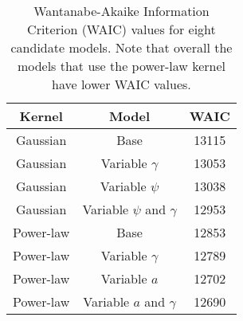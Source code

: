 
\begin{table}
\begin{center}
\begin{tabular}{ccc} 
\toprule
Kernel    & Model                        & WAIC  \\ \midrule
Gaussian  & Base                         & 13115 \\
Gaussian  & Variable $\gamma$            & 13053 \\
Gaussian  & Variable $\psi$              & 13038 \\   
Gaussian  & Variable $\psi$ and $\gamma$ & 12953 \\
Power-law & Base                         & 12853 \\
Power-law & Variable $\gamma$            & 12789 \\
Power-law & Variable $a$                 & 12702 \\
Power-law & Variable $a$ and $\gamma$    & 12690 \\  \bottomrule
\end{tabular}
\caption{Wantanabe-Akaike Information Criterion (WAIC) values for
  eight candidate models. Note that overall the models that use the
  power-law kernel have lower WAIC values.}
\end{center}
\label{table:WAIC}
\vspace{2cm}
\end{table}



